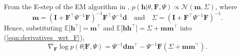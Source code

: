 \documentclass[msc,deptreport.inf]{infthesis} %
\newcommand{\matr}[1]{\mathbf{#1}}
\newcommand{\E}{\mathbb E}
\begin{document}
From the E-step of the EM algorithm in \cite{barber2007}, $p(\matr{h} | \theta, \matr{F}, \Psi) \propto \mathcal{N}(\matr{m}, \Sigma)$, where
\begin{equation}\label{eqn:variational_params}
	\matr{m} = (\matr{I} + \matr{F}^\intercal \Psi^{-1} \matr{F})^{-1} \matr{F}^\intercal \Psi^{-1} \matr{d}
	\quad \text{and} \quad \Sigma = (\matr{I} + \matr{F}^\intercal \Psi^{-1} \matr{F})^{-1}.
\end{equation}
Hence, substituting $\E \big[ \matr{h}^\intercal \big] = \matr{m}^\intercal$ and $\E \big[ \matr{h} \matr{h}^\intercal \big] = \Sigma + \matr{m} \matr{m}^\intercal$ into (\ref{eqn:derivatives_wrt_F}), 
\begin{equation}
	\nabla_{\matr{F}} \log p(\theta | \matr{F}, \Psi) 
	= \Psi^{-1} \matr{d} \matr{m}^\intercal
	- \Psi^{-1} \matr{F}  (\Sigma + \matr{m} \matr{m}^\intercal).
\end{equation}
\end{document}
